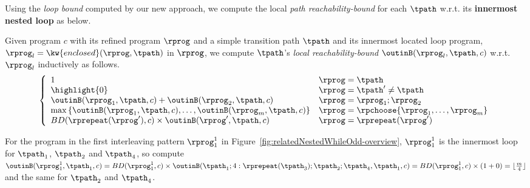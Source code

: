 Using the \emph{loop bound} computed by our new approach, we compute the local \emph{path reachability-bound} for
each $\tpath$ w.r.t. its \textbf{innermost nested loop} as below.

\begin{defn}
 \label{def:pathlocalrb}
 Given program $c$ with its refined program $\rprog$ and a simple transition path $\tpath$ and its innermost located loop program, $\rprog_l = \kw{enclosed}(\rprog, \tpath)$ in $\rprog$,
 we compute $\tpath$'s \emph{local reachability-bound} $\outinB(\rprog_l, \tpath, c)$ w.r.t. $\rprog_l$ inductively as follows.
 {\small
 \[
 \left\{
 \begin{array}{ll}
 1 & \rprog = \tpath\\
 \highlight{0} & \rprog = \tpath' \neq \tpath\\
 \outinB(\rprog_1, \tpath, c) + \outinB(\rprog_2, \tpath, c) & \rprog = \rprog_1;\rprog_2 \\
 \max\left\{ \outinB(\rprog_1, \tpath, c), \ldots, \outinB(\rprog_m, \tpath, c) \right\} 
 & \rprog = \rpchoose{\rprog_1, \ldots, \rprog_m } \\
 BD(\rprepeat(\rprog'), c) \times \outinB(\rprog', \tpath, c) & \rprog = \rprepeat(\rprog')
 \end{array}
 \right.
 \]
 }
 \end{defn}

 For the program in the first interleaving pattern $\rprog_1^1$ in Figure~\ref{fig:relatedNestedWhileOdd-overview}, $\rprog_1^1$ is the innermost loop for $\tpath_1$, $\tpath_2$ and $\tpath_4$, 
 so compute $\outinB(\rprog_1^1, \tpath_1, c) = BD(\rprog_1^1, c) \times \outinB(\tpath_1; 4:\rprepeat(\tpath_3); \tpath_2; \tpath_4, \tpath_1, c)
 = BD(\rprog_1^1, c) \times (1 + 0) = \lfloor \frac{m}{4} \rfloor $ and the same for $\tpath_2$ and $\tpath_4$.

